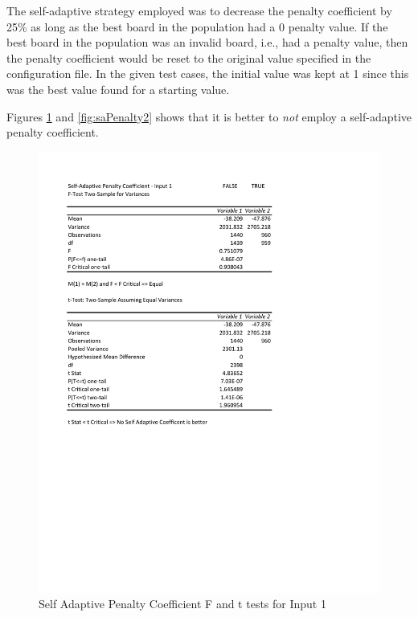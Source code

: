 \documentclass[times]{article}
\begin{document}
	The self-adaptive strategy employed was to decrease the penalty coefficient by 25\% as long as the best board in the population had a 0 penalty value. If the best board in the population was an invalid board, i.e., had a penalty value, then the penalty coefficient would be reset to the original value specified in the configuration file. In the given test cases, the initial value was kept at 1 since this was the best value found for a starting value.

	Figures \ref{fig:saPenalty1} and \ref{fig:saPenalty2} shows that it is better to \textit{not} employ a self-adaptive penalty coefficient.

	\begin{figure}
		\caption{Self Adaptive Penalty Coefficient F and t tests for Input 1}
		\label{fig:saPenalty1}
		\includegraphics[width=\textwidth]{./t_test/S-APenaltyCoeff1}
	\end{figure}
\end{document}
